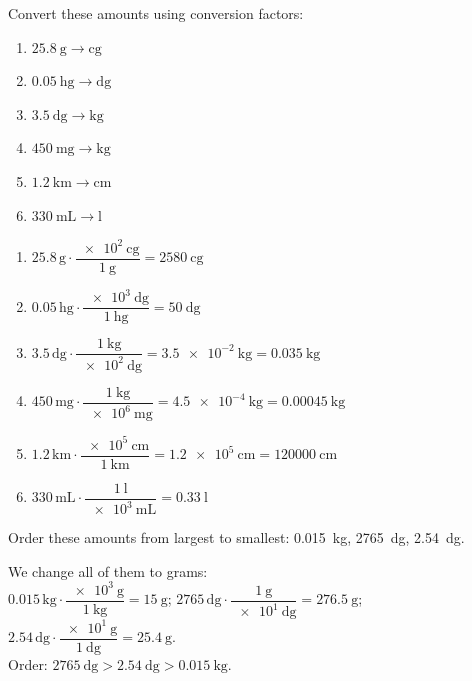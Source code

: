 \begin{exercise}
    Convert these amounts using conversion factors:
    \begin{enumerate}[label=\letraminuscula]
        \item \(\qty{25.8}{\g} \to \unit{\centi\gram}\)
        \item \(\qty{0.05}{\hecto\gram} \to \unit{\deci\gram}\)
        \item \(\qty{3.5}{\deca\gram} \to \unit{\kg}\)
        \item \(\qty{450}{\mg} \to \unit{\kg}\)
        \item \(\qty{1.2}{\km} \to \unit{\cm}\)
        \item \(\qty{330}{\mL} \to \unit{\litre}\)
    \end{enumerate}
    \begin{solu}
        \begin{enumerate}[label=\alph*)]
            \item \(\num{25.8}\,\unit{\g} \cdot \dfrac{\qty{e2}{\centi\gram}}{\qty{1}{\g}} = \qty{2580}{\centi\gram}\)
            \item \(\num{0.05}\,\unit{\hecto\gram} \cdot \dfrac{\qty{e3}{\deci\gram}}{\qty{1}{\hecto\gram}} = \qty{50}{\deci\gram}\)
            \item \(\num{3.5}\,\unit{\deca\gram} \cdot \dfrac{\qty{1}{\kg}}{\qty{e2}{\deca\gram}} = \qty{3.5e-2}{\kg} = \qty{0.035}{\kg}\)
            \item \(\num{450}\,\unit{\mg} \cdot \dfrac{\qty{1}{\kg}}{\qty{e6}{\mg}} = \qty{4.5e-4}{\kg} = \qty{0.00045}{\kg}\)
            \item \(\num{1.2}\,\unit{\km} \cdot \dfrac{\qty{e5}{\cm}}{\qty{1}{\km}} = \qty{1.2e5}{\cm} = \qty{120000}{\cm}\)
            \item \(\num{330}\,\unit{\mL} \cdot \dfrac{\qty{1}{\litre}}{\qty{e3}{\mL}} = \qty{0.33}{\litre}\)
        \end{enumerate}
    \end{solu}
\end{exercise}

\begin{exercise}
    Order these amounts from largest to smallest: \qty{0.015}{\kg}, \qty{2765}{\deci\gram}, \qty{2.54}{\deca\gram}.
    \begin{solu}
        We change all of them to grams: \\
        \(\num{0.015}\,\unit{\kg} \cdot \dfrac{\qty{e3}{\g}}{\qty{1}{\kg}} = \qty{15}{\g}\); \quad
        \(\num{2765}\,\unit{\deci\gram} \cdot \dfrac{\qty{1}{\g}}{\qty{e1}{\deci\gram}} = \qty{276.5}{\g}\); \quad
        \(\num{2.54}\,\unit{\deca\gram} \cdot \dfrac{\qty{e1}{\g}}{\qty{1}{\deca\gram}} = \qty{25.4}{\g}\). \\
        Order: \(\qty{2765}{\deci\gram} > \qty{2.54}{\deca\gram} > \qty{0.015}{\kg}\).
    \end{solu}
\end{exercise}

